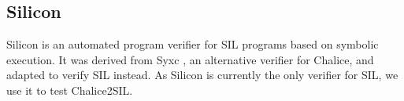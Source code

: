 
\subsection{Silicon}\label{sct:silicon}
Silicon is an automated program verifier for SIL programs based on symbolic execution. 
It was derived from Syxc \cite{schwerhoff2011symbolic}, an alternative verifier for Chalice, and adapted to verify SIL instead.
As Silicon is currently the only verifier for SIL, we use it to test Chalice2SIL.
